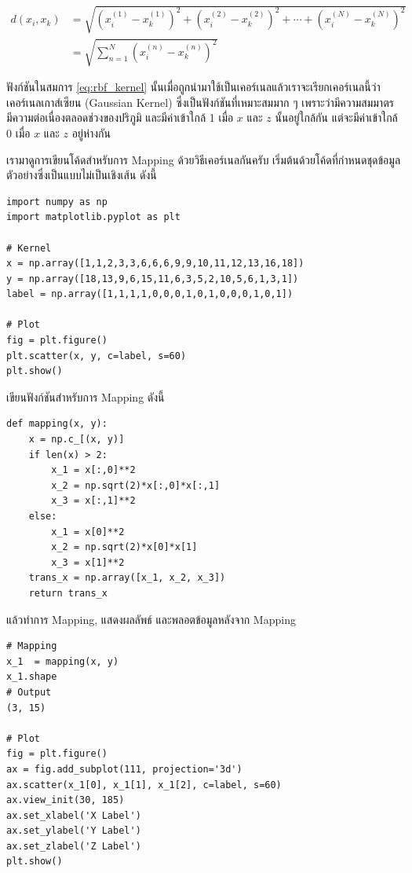 \begin{align}
    d(x_{i}, x_{k}) &= 
    \sqrt{(x^{(1)}_{i} - x^{(1)}_{k})^{2} + (x^{(2)}_{i} - x^{(2)}_{k})^{2} + \cdots + 
    (x^{(N)}_{i} - x^{(N)}_{k})^{2}} \\
    &= \sqrt{\sum^{N}_{n=1} (x^{(n)}_{i} - x^{(n)}_{k})^{2}}
\end{align}

ฟังก์ชันในสมการ \ref{eq:rbf_kernel} นั้นเมื่อถูกนำมาใช้เป็นเคอร์เนลแล้วเราจะเรียกเคอร์เนลนี้ว่าเคอร์เนลเกาส์เซียน (Gaussian Kernel)
ซึ่งเป็นฟังก์ชันที่เหมาะสมมาก ๆ เพราะว่ามีความสมมาตร มีความต่อเนื่องตลอดช่วงของปริภูมิ และมีค่าเข้าใกล้ 1 เมื่อ $x$ และ $z$ นั้นอยู่ใกล้กัน 
แต่จะมีค่าเข้าใกล้ 0 เมื่อ $x$ และ $z$ อยู่ห่างกัน

เรามาดูการเขียนโค้ดสำหรับการ Mapping ด้วยวิธีเคอร์เนลกันครับ เริ่มต้นด้วยโค้ดที่กำหนดชุดข้อมูลตัวอย่างซึ่งเป็นแบบไม่เป็นเชิงเส้น ดังนี้

\begin{lstlisting}[style=MyPython]
import numpy as np
import matplotlib.pyplot as plt

# Kernel
x = np.array([1,1,2,3,3,6,6,6,9,9,10,11,12,13,16,18])
y = np.array([18,13,9,6,15,11,6,3,5,2,10,5,6,1,3,1])
label = np.array([1,1,1,1,0,0,0,1,0,1,0,0,0,1,0,1])

# Plot
fig = plt.figure()
plt.scatter(x, y, c=label, s=60)
plt.show()
\end{lstlisting}

\noindent เขียนฟังก์ชันสำหรับการ Mapping ดังนี้

\begin{lstlisting}[style=MyPython]
def mapping(x, y):    
	x = np.c_[(x, y)]				
    if len(x) >	2:        
    	x_1 = x[:,0]**2        
        x_2 = np.sqrt(2)*x[:,0]*x[:,1]        
        x_3 = x[:,1]**2								
    else:            
    	x_1 = x[0]**2        
        x_2 = np.sqrt(2)*x[0]*x[1]        
        x_3 = x[1]**2			    
    trans_x = np.array([x_1, x_2, x_3])				
    return trans_x	
\end{lstlisting}

\noindent แล้วทำการ Mapping, แสดงผลลัพธ์ และพลอตข้อมูลหลังจาก Mapping

\begin{lstlisting}[style=MyPython]
# Mapping
x_1  = mapping(x, y)
x_1.shape
# Output
(3, 15)

# Plot
fig = plt.figure()
ax = fig.add_subplot(111, projection='3d')
ax.scatter(x_1[0], x_1[1], x_1[2], c=label, s=60)
ax.view_init(30, 185)
ax.set_xlabel('X Label')
ax.set_ylabel('Y Label')
ax.set_zlabel('Z Label')
plt.show()
\end{lstlisting}

